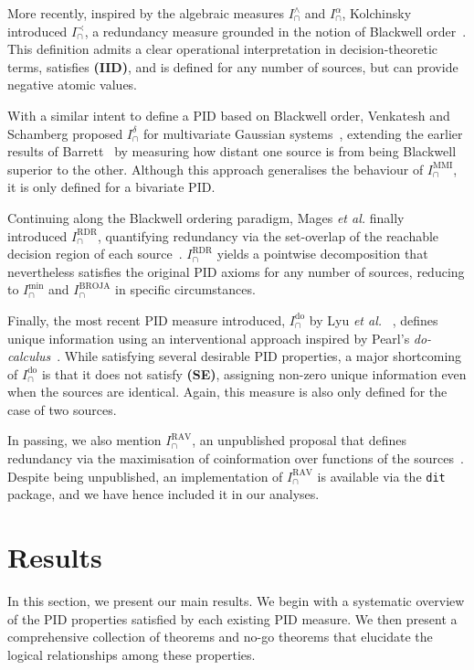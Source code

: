 \documentclass{article}
\makeatletter
\newcommand{\etal}{\textit{et al.\@} }
\newcommand{\IID}{\textbf{(IID)}\xspace} %
\newcommand{\SE}{\textbf{(SE)}\xspace} %
\newcommand{\Imin}{\ensuremath{I_\cap^{\text{min}}}\xspace}
\newcommand{\Iwedge}{\ensuremath{I_\cap^{\wedge}}\xspace}
\newcommand{\IBROJA}{\ensuremath{I_\cap^{\text{BROJA}}}\xspace}
\newcommand{\IMMI}{\ensuremath{I_\cap^{\text{MMI}}}\xspace}
\newcommand{\Ialpha}{\ensuremath{I_\cap^{\alpha}}\xspace}
\newcommand{\Iprec}{\ensuremath{I_\cap^{\prec}}\xspace}
\newcommand{\Ido}{\ensuremath{I_\cap^{\text{do}}}\xspace}
\newcommand{\Idelta}{\ensuremath{I_\cap^{\delta}}\xspace}
\newcommand{\IRAV}{\ensuremath{I_\cap^{\text{RAV}}}\xspace}
\newcommand{\IRDR}{\ensuremath{I_\cap^{\text{RDR}}}\xspace}
\makeatother
\begin{document}
More recently, inspired by the algebraic measures \Iwedge and \Ialpha, Kolchinsky introduced \Iprec, a redundancy measure grounded in the notion of Blackwell order~\cite{kolchinsky2022novel}. This definition admits a clear operational interpretation in decision-theoretic terms, satisfies \IID, and is defined for any number of sources, but can provide negative atomic values.

With a similar intent to define a PID based on Blackwell order, Venkatesh and Schamberg proposed \Idelta for multivariate Gaussian systems~\cite{venkatesh2022partial}, extending the earlier results of Barrett~\cite{barrett2015exploration} by measuring how distant one source is from being Blackwell superior to the other. Although this approach generalises the behaviour of \IMMI, it is only defined for a bivariate PID.

Continuing along the Blackwell ordering paradigm, Mages \etal finally introduced \IRDR, quantifying redundancy via the set-overlap of the reachable decision region of each source~\cite{mages2023decomposing}. \IRDR yields a pointwise decomposition that nevertheless satisfies the original PID axioms for any number of sources, reducing to \Imin and \IBROJA in specific circumstances. 

Finally, the most recent PID measure introduced, \Ido by Lyu \etal~\cite{lyu2024explicit}, defines unique information using an interventional approach inspired by Pearl's \textit{do-calculus}~\cite{pearl1995causal, pearl2009causal, pearl2012calculus}. While satisfying several desirable PID properties, a major shortcoming of \Ido is that it does not satisfy \SE, assigning non-zero unique information even when the sources are identical. Again, this measure is also only defined for the case of two sources.

In passing, we also mention \IRAV, an unpublished proposal that defines redundancy via the maximisation of coinformation over functions of the sources~\cite{james2018dit}. Despite being unpublished, an implementation of \IRAV is available via the \verb|dit| package, and we have hence included it in our analyses.




\section{Results}
\label{sec:results}

In this section, we present our main results. We begin with a systematic overview of the PID properties satisfied by each existing PID measure. We then present a comprehensive collection of theorems and no-go theorems that elucidate the logical relationships among these properties.
\end{document}
